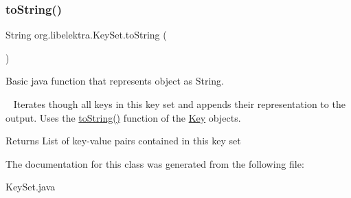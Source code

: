 \subsubsection{\texorpdfstring{to\+String()}{toString()}}
{\footnotesize\ttfamily String org.\+libelektra.\+Key\+Set.\+to\+String (\begin{DoxyParamCaption}{ }\end{DoxyParamCaption})\hspace{0.3cm}{\ttfamily [inline]}}



Basic java function that represents object as String. 

~\newline
 Iterates though all keys in this key set and appends their representation to the output. Uses the \hyperlink{classorg_1_1libelektra_1_1KeySet_a9c1e2918acce8c7cda5be406989c87af}{to\+String()} function of the \hyperlink{classorg_1_1libelektra_1_1Key}{Key} objects.

\begin{DoxyReturn}{Returns}
List of key-\/value pairs contained in this key set 
\end{DoxyReturn}


The documentation for this class was generated from the following file\+:\begin{DoxyCompactItemize}
\item 
Key\+Set.\+java\end{DoxyCompactItemize}
